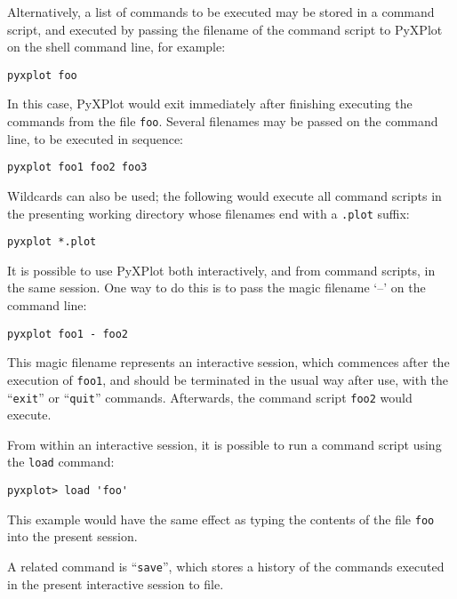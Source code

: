Alternatively, a list of commands to be executed may be stored in a command
script, and executed by passing the filename of the command script to PyXPlot
on the shell command line, for example:

\begin{verbatim}
pyxplot foo
\end{verbatim}

\noindent In this case, PyXPlot would exit immediately after finishing
executing the commands from the file \texttt{foo}. Several filenames may be
passed on the command line, to be executed in sequence:

\begin{verbatim}
pyxplot foo1 foo2 foo3
\end{verbatim}

\noindent Wildcards can also be used; the following would execute all command
scripts in the presenting working directory whose filenames end with a
\texttt{.plot} suffix:

\begin{verbatim}
pyxplot *.plot
\end{verbatim}

It is possible to use PyXPlot both interactively, and from command scripts, in
the same session. One way to do this is to pass the magic filename `--' on the
command line:

\begin{verbatim}
pyxplot foo1 - foo2
\end{verbatim}

\noindent This magic filename represents an interactive session, which
commences after the execution of \texttt{foo1}, and should be terminated in the
usual way after use, with the ``\texttt{exit}'' or ``\texttt{quit}'' commands.
Afterwards, the command script \texttt{foo2} would execute.

From within an interactive session, it is possible to run a command script
using the \texttt{load} command:

\begin{verbatim}
pyxplot> load 'foo'
\end{verbatim}

\noindent This example would have the same effect as typing the contents of the
file \texttt{foo} into the present session.

A related command is ``\texttt{save}'', which stores a history of the commands executed in the present
interactive session to file.

